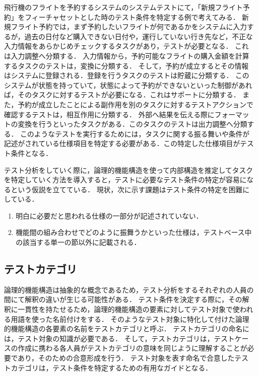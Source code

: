 飛行機のフライトを予約するシステムのシステムテストにて，「新規フライト予約」をフィーチャセットとした時のテスト条件を特定する例で考えてみる．
新規フライト予約では，まず予約したいフライトが何であるかをシステムに入力するが，過去の日付など購入できない日付や，運行していない行き先など，不正な入力情報をあらかじめチェックするタスクがあり，テストが必要となる．
これは入力調整へ分類する．
入力情報から，予約可能なフライトの購入金額を計算するタスクのテストは，変換に分類する．
そして，予約が成立するとその情報はシステムに登録される．登録を行うタスクのテストは貯蔵に分類する．
このシステムが状態を持っていて，状態によって予約ができないといった制御があれば，そのタスクに対するテストが必要になる．これはサポートに分類する．
また，予約が成立したことによる副作用を別のタスクに対するテストアクションで確認するテストは，相互作用に分類する．
外部へ結果を伝える際にフォーマットの変換を行うといったタスクがある．このタスクのテストは出力調整へ分類する．
このようなテストを実行するためには，タスクに関する振る舞いや条件が記述がされている仕様項目を特定する必要がある．この特定した仕様項目がテスト条件となる．


テスト分析をしていく際に，論理的機能構造を使って内部構造を推定してタスクを特定していく方法を導入すると，テストに必要なテスト条件の特定が容易になるという仮説を立てている．
現状，次に示す課題はテスト条件の特定を困難にしている．

\begin{enumerate}
\item 明白に必要だと思われる仕様の一部分が記述されていない．
\item 機能間の組み合わせでどのように振舞うかといった仕様は，テストベース中の該当する単一の節以外に記載される．
\end{enumerate}

\subsection{テストカテゴリ}
論理的機能構造は抽象的な概念であるため，テスト分析をするそれぞれの人員の間にて解釈の違いが生じる可能性がある．
テスト条件を決定する際に，その解釈に一貫性を持たせるため，論理的機能構造の要素に対してテスト対象で使われる用語を使った名前付けをする．
そのようなテスト対象に特化して付けた論理的機能構造の各要素の名前をテストカテゴリと呼ぶ．
テストカテゴリの命名には，テスト対象の知識が必要である．
そして，テストカテゴリは，テストケースの作成に携わる各人員がテストカテゴリの意味を同じように理解することが必要であり，そのための合意形成を行う．
テスト対象を表す命名で合意したテストカテゴリは，テスト条件を特定するための有用なガイドとなる．

